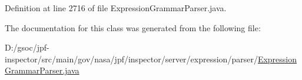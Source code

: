 Definition at line 2716 of file Expression\+Grammar\+Parser.\+java.



The documentation for this class was generated from the following file\+:\begin{DoxyCompactItemize}
\item 
D\+:/gsoc/jpf-\/inspector/src/main/gov/nasa/jpf/inspector/server/expression/parser/\hyperlink{_expression_grammar_parser_8java}{Expression\+Grammar\+Parser.\+java}\end{DoxyCompactItemize}
